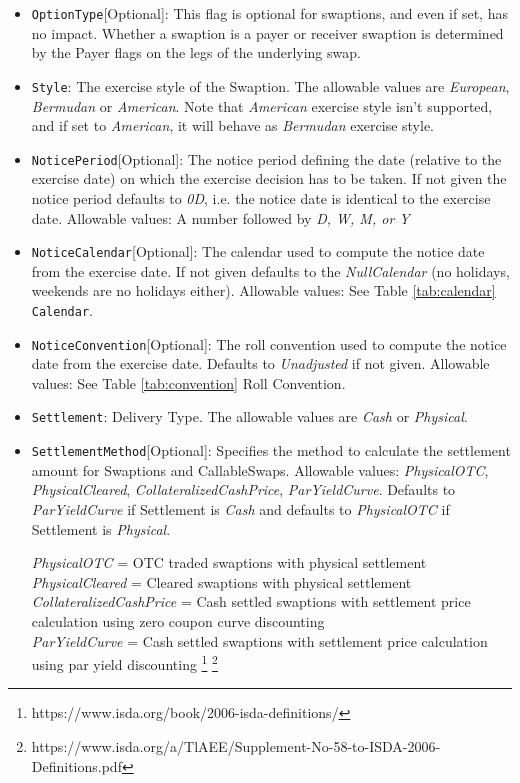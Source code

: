 \begin{itemize}
\item \lstinline!OptionType![Optional]: This flag is optional for swaptions, and even if set, has no impact. Whether a swaption is a payer or receiver swaption is determined by the Payer flags on the legs of the underlying swap.

\item  \lstinline!Style!: The exercise style of the Swaption. The allowable values are \emph{European},  \emph{Bermudan} or  \emph{American}.  Note that  \emph{American} exercise style isn't supported, and if set to  \emph{American}, it will behave as  \emph{Bermudan} exercise style.

\item \lstinline!NoticePeriod![Optional]: The notice period defining the date (relative to the exercise date) on which the exercise
  decision has to be taken. If not given the notice period defaults to \emph{0D}, i.e. the notice date is identical to the
  exercise date. Allowable values: A number followed by \emph{D, W, M, or Y}

\item \lstinline!NoticeCalendar![Optional]: The calendar used to compute the notice date from the exercise date. If not given
  defaults to the \emph{NullCalendar} (no holidays, weekends are no holidays either). Allowable values: See Table \ref{tab:calendar} \lstinline!Calendar!.

\item \lstinline!NoticeConvention![Optional]: The roll convention used to compute the notice date from the exercise date. Defaults to
  \emph{Unadjusted} if not given. Allowable values: See Table \ref{tab:convention} Roll Convention.

\item  \lstinline!Settlement!: Delivery Type. The allowable values are \emph{Cash} or \emph{Physical}.

\item \lstinline!SettlementMethod![Optional]: Specifies the method to calculate the settlement amount for Swaptions and CallableSwaps. Allowable values: \emph{PhysicalOTC}, \emph{PhysicalCleared}, \emph{CollateralizedCashPrice}, \emph{ParYieldCurve}. Defaults to \emph{ParYieldCurve} if Settlement is \emph{Cash} and defaults to \emph{PhysicalOTC} if Settlement is \emph{Physical}.

\emph{PhysicalOTC} = OTC traded swaptions with physical settlement\\
\emph{PhysicalCleared} = Cleared swaptions with physical settlement\\
\emph{CollateralizedCashPrice} = Cash settled swaptions with settlement price calculation using zero coupon curve discounting \\
\emph{ParYieldCurve}  = Cash settled swaptions with settlement price calculation using par yield discounting \footnote{https://www.isda.org/book/2006-isda-definitions/} \footnote{https://www.isda.org/a/TlAEE/Supplement-No-58-to-ISDA-2006-Definitions.pdf} \\


\end{itemize}
